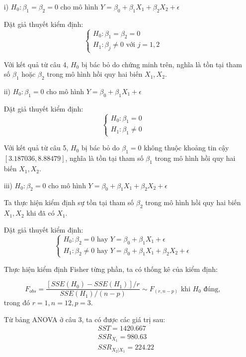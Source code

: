 \documentclass[a4paper]{article}
\theoremstyle{nonumberplain}
\begin{document}
\begin{enumerate}
	\item[i)] $H_0 : \beta_1 = \beta_2 = 0$ cho mô hình $Y = \beta_0 + \beta_1 X_1 + \beta_2 X_2 + \epsilon $
	
	Đặt giả thuyết kiểm định:
	\[\begin{cases}
		H_0 : \beta_1 = \beta_2 = 0 \\
		H_1: \beta_j \neq 0 \text{ với } j=1,2 
	\end{cases}\]

	Với kết quả từ câu 4, $H_0$ bị bác bỏ do chứng minh trên, nghĩa là tồn tại tham số $\beta_1$ hoặc $\beta_2$ trong mô hình hồi quy hai biến $X_1, X_2$.
	
	\item[ii)] $H_0 : \beta_1 = 0$ cho mô hình $Y = \beta_0 + \beta_1 X_1 + \epsilon $
	
	Đặt giả thuyết kiểm định:
	\[\begin{cases}
		H_0 : \beta_1 = 0 \\
		H_1: \beta_1 \neq 0
	\end{cases}\]

	Với kết quả từ câu 5, $H_0$ bị bác bỏ do $\beta_1 = 0$ không thuộc khoảng tin cậy $[3.187036,8.88479]$, nghĩa là tồn tại tham số $\beta_1$ trong mô hình hồi quy hai biến $X_1, X_2$.
	
	\item[iii)] $H_0 : \beta_2 = 0$ cho mô hình $Y = \beta_0 + \beta_1 X_1 + \beta_2 X_2 + \epsilon $
	
	Ta thực hiện kiểm định sự tồn tại tham số $\beta_2$ trong mô hình hồi quy hai biến $X_1, X_2$ khi đã có $X_1$.
	
	Đặt giả thuyết kiểm định:
	\[\begin{cases}
		H_0 : \beta_2 = 0 \text{ hay } Y = \beta_0 + \beta_1 X_1 + \epsilon \\
		H_1 : \beta_2 \ne 0 \text{ hay } Y = \beta_0 + \beta_1 X_1 + \beta_2 X_2 + \epsilon 
	\end{cases}\]
	
	Thực hiện kiểm định Fisher từng phần, ta có thống kê của kiểm định: 
	
	$$F_{obs} = \displaystyle \frac{\left [ SSE (H_0) - SSE(H_1) \right ] / r}{SSE(H_1)/(n-p)}  \sim F_{(r,n-p)} \text{ khi } H_0 \text{ đúng},$$
	trong đó $r = 1, n = 12, p = 3$.
	
	Từ bảng ANOVA ở câu 3, ta có được các giá trị sau:
	\begin{align*}
		&SST = 1420.667\\
		&SSR_{X_1} = 980.63\\
		&SSR_{X_2|X_1} = 224.22
	\end{align*}
	

\end{enumerate}
\end{document}
